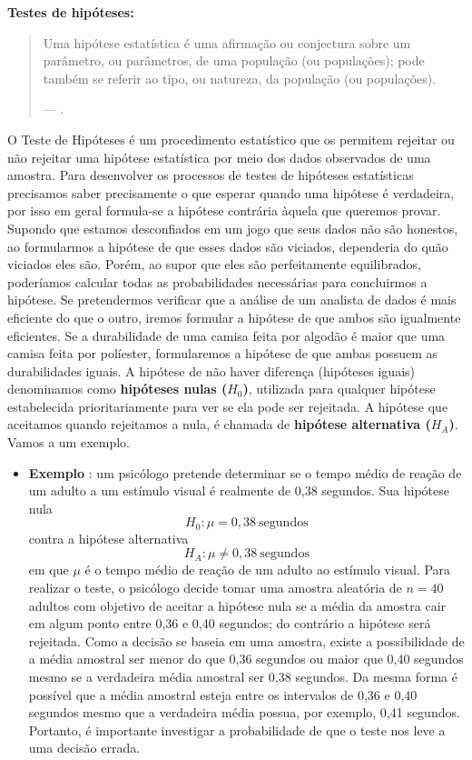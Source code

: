 \documentclass[
  openany]{book}
\providecommand{\tightlist}{%
  \setlength{\itemsep}{0pt}\setlength{\parskip}{0pt}}
\begin{document}
\textbf{Testes de hipóteses:}

\begin{quote}
Uma hipótese estatística é uma afirmação ou conjectura sobre um parâmetro, ou parâmetros, de uma população (ou populações); pode também se referir ao tipo, ou natureza, da população (ou populações).

--- \citet{freund2009estatistica}.
\end{quote}

O Teste de Hipóteses é um procedimento estatístico que os permitem rejeitar ou não rejeitar uma hipótese estatística por meio dos dados observados de uma amostra. Para desenvolver os processos de testes de hipóteses estatísticas precisamos saber precisamente o que esperar quando uma hipótese é verdadeira, por isso em geral formula-se a hipótese contrária àquela que queremos provar. Supondo que estamos desconfiados em um jogo que seus dados não são honestos, ao formularmos a hipótese de que esses dados são viciados, dependeria do quão viciados eles são. Porém, ao supor que eles são perfeitamente equilibrados, poderíamos calcular todas as probabilidades necessárias para concluirmos a hipótese. Se pretendermos verificar que a análise de um analista de dados é mais eficiente do que o outro, iremos formular a hipótese de que ambos são igualmente eficientes. Se a durabilidade de uma camisa feita por algodão é maior que uma camisa feita por políester, formularemos a hipótese de que ambas possuem as durabilidades iguais. A hipótese de não haver diferença (hipóteses iguais) denominamos como \textbf{hipóteses nulas (\(H_0\))}, utilizada para qualquer hipótese estabelecida prioritariamente para ver se ela pode ser rejeitada. A hipótese que aceitamos quando rejeitamos a nula, é chamada de \textbf{hipótese alternativa (\(H_A\))}. Vamos a um exemplo.

\begin{itemize}
\tightlist
\item
  \textbf{Exemplo} \citep{freund2009estatistica}: um psicólogo pretende determinar se o tempo médio de reação de um adulto a um estímulo visual é realmente de 0,38 segundos. Sua hipótese nula
  \[H_0: \mu=0,38\ \mbox{segundos}\]
  contra a hipótese alternativa
  \[H_A: \mu \neq 0,38\ \mbox{segundos}\]
  em que \(\mu\) é o tempo médio de reação de um adulto ao estímulo visual. Para realizar o teste, o psicólogo decide tomar uma amostra aleatória de \(n=40\) adultos com objetivo de aceitar a hipótese nula se a média da amostra cair em algum ponto entre 0,36 e 0,40 segundos; do contrário a hipótese será rejeitada. Como a decisão se baseia em uma amostra, existe a possibilidade de a média amostral ser menor do que 0,36 segundos ou maior que 0,40 segundos mesmo se a verdadeira média amostral ser 0,38 segundos. Da mesma forma é possível que a média amostral esteja entre os intervalos de 0,36 e 0,40 segundos mesmo que a verdadeira média possua, por exemplo, 0,41 segundos. Portanto, é importante investigar a probabilidade de que o teste nos leve a uma decisão errada.
\end{itemize}
\end{document}

